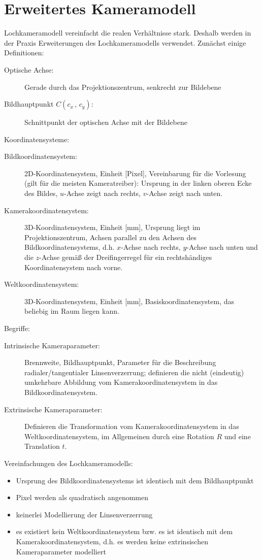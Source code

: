 \section{Erweitertes Kameramodell}

Lochkameramodell vereinfacht die realen Verhältnisse stark. Deshalb werden in der Praxis Erweiterungen des Lochkameramodells verwendet. Zunächst einige Definitionen:
\begin{description}
\item[Optische Achse:] Gerade durch das Projektionszentrum, senkrecht zur Bildebene
\item[Bildhauptpunkt $C(c_x \, , \, c_y)$:] Schnittpunkt der optischen Achse mit der Bildebene
\end{description}
Koordinatensysteme:
\begin{description}
\item[Bildkoordinatensystem:] 2D-Koordinatensystem, Einheit [Pixel], Vereinbarung für die Vorlesung (gilt für die meisten Kameratreiber): Ursprung in der linken oberen Ecke des Bildes, $u$-Achse zeigt nach rechts, $v$-Achse zeigt nach unten.
\item[Kamerakoordinatensystem:] 3D-Koordinatensystem, Einheit [mm], Ursprung liegt im Projektionszentrum, Achsen parallel zu den Achsen des Bildkoordinatensystems, d.h. $x$-Achse nach rechts, $y$-Achse nach unten und die $z$-Achse gemäß der Dreifingerregel für ein rechtshändiges Koordinatensystem nach vorne.
\item[Weltkoordinatensystem:] 3D-Koordinatensystem, Einheit [mm], Basiskoordinatensystem, das beliebig im Raum liegen kann.
\end{description}
Begriffe:
\begin{description}
\item[Intrinsische Kameraparameter:] Brennweite, Bildhauptpunkt, Parameter für die Beschreibung radialer/tangentialer Linsenverzerrung; definieren die nicht (eindeutig) umkehrbare Abbildung vom Kamerakoordinatensystem in das Bildkoordinatensystem.
\item[Extrinsische Kameraparameter:] Definieren die Transformation vom Kamerakoordinatensystem in das Weltkoordinatensystem, im Allgemeinen durch eine Rotation $R$ und eine Translation $t$.
\end{description}
Vereinfachungen des Lochkameramodells:
\begin{itemize}
\item Ursprung des Bildkoordinatensystems ist identisch mit dem Bildhauptpunkt
\item Pixel werden als quadratisch angenommen
\item keinerlei Modellierung der Linsenverzerrung
\item es existiert kein Weltkoordinatensystem bzw. es ist identisch mit dem Kamerakoordinatensystem, d.h. es werden keine extrinsischen Kameraparameter modelliert
\end{itemize}
